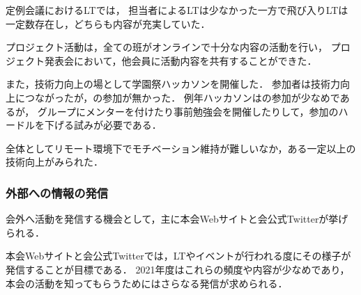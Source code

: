     定例会議におけるLTでは，
    担当者によるLTは少なかった一方で飛び入りLTは一定数存在し，どちらも内容が充実していた．

    プロジェクト活動は，全ての班がオンラインで十分な内容の活動を行い，
    プロジェクト発表会において，他会員に活動内容を共有することができた．

    また，技術力向上の場として学園祭ハッカソンを開催した．
    参加者は技術力向上につながったが，\firstGrade{}の参加が無かった．
    例年ハッカソンは\firstGrade{}の参加が少なめであるが，
    グループにメンターを付けたり事前勉強会を開催したりして，参加のハードルを下げる試みが必要である．
    
    全体としてリモート環境下でモチベーション維持が難しいなか，ある一定以上の技術向上がみられた．

\subsubsection*{外部への情報の発信}
    会外へ活動を発信する機会として，主に本会Webサイトと会公式Twitterが挙げられる．

    本会Webサイトと会公式Twitterでは，LTやイベントが行われる度にその様子が発信することが目標である．
    2021年度はこれらの頻度や内容が少なめであり，本会の活動を知ってもらうためにはさらなる発信が求められる．
     
